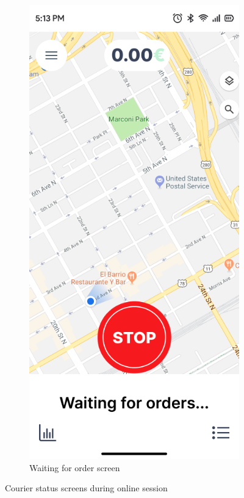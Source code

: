\begin{figure}[H]
\begin{subfigure}[b]{0.48\textwidth}
        \label{fig:go_screen}
    \end{subfigure}
    \hfill
    \begin{subfigure}[b]{0.48\textwidth}
        \centering
        \includegraphics[width=\textwidth]{images/waiting_screen.png}
        \caption{Waiting for order screen}
        \label{fig:waiting_screen}
    \end{subfigure}
    \caption{Courier status screens during online session}
    \label{fig:courier_status}
\end{figure}

